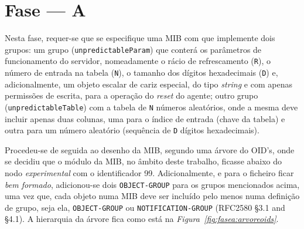 \section{Fase --- A}

Nesta fase, requer-se que se especifique uma MIB com que implemente dois grupos:
um grupo (\texttt{unpredictableParam}) que conterá os parâmetros de
funcionamento do servidor, nomeadamente o rácio de refrescamento (\texttt{R}),
o número de entrada na tabela (\texttt{N}), o tamanho dos dígitos hexadecimais
(\texttt{D}) e, adicionalmente, um objeto escalar de cariz especial, do tipo
\emph{string} e com apenas permissões de escrita, para a operação do
\emph{reset} do agente; outro grupo (\texttt{unpredictableTable}) com a tabela
de \texttt{N} números aleatórios, onde a mesma deve incluir apenas duas colunas,
uma para o índice de entrada (chave da tabela) e outra para um número aleatório
(sequência de \texttt{D} dígitos hexadecimais).

Procedeu-se de seguida ao desenho da MIB, segundo uma árvore do OID's, onde se
decidiu que o módulo da MIB, no âmbito deste trabalho, ficasse abaixo do nodo
\emph{experimental} com o identificador 99. Adicionalmente, e para o ficheiro
ficar \emph{bem formado}, adicionou-se dois \texttt{OBJECT-GROUP} para os grupos
mencionados acima, uma vez que, cada objeto numa MIB deve ser incluído pelo
menos numa definição de grupo, seja ela, \texttt{OBJECT-GROUP} ou
\texttt{NOTIFICATION-GROUP} (RFC2580 §3.1 and §4.1). A hierarquia da árvore fica
como está na \emph{Figura~\ref{fig:fasea:arvoreoids}}. 


